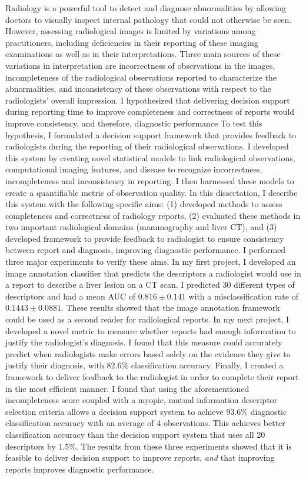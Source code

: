 Radiology is a powerful tool to detect and diagnose abnormalities by allowing doctors to visually inspect internal pathology that could not otherwise be seen. 
However, assessing radiological images is limited by variations among practitioners, including deficiencies in their reporting of these imaging examinations as well as in their interpretations. 
Three main sources of these variations in interpretation are incorrectness of observations in the images, incompleteness of the radiological observations reported to characterize the abnormalities, and inconsistency of these observations with respect to the radiologists' overall impression.
I hypothesized that delivering decision support during reporting time to improve completeness and correctness of reports would improve consistency, and therefore, diagnostic performance
To test this hypothesis, I formulated a decision support framework that provides feedback to radiologists during the reporting of their radiological observations.
I developed this system by creating novel statistical models to link radiological observations, computational imaging features, and disease to recognize incorrectness, incompleteness and inconsistency in reporting. 
I then harnessed these models to create a quantifiable metric of observation quality. 
In this dissertation, I describe this system with the following specific aims: (1) developed methods to assess completeness and correctness of radiology reports, (2) evaluated these methods in two important radiological domains (mammography and liver CT), and (3) developed framework to provide feedback to radiologist to ensure consistency between report and diagnosis, improving diagnostic performance.
I performed three major experiments to verify these aims.
In my first project, I developed an image annotation classifier that predicts the descriptors a radiologist would use in a report to describe a liver lesion on a CT scan. 
I predicted 30 different types of descriptors and had a mean AUC of $0.816\pm0.141$ with a misclassification rate of $0.1443\pm0.0881$. 
These results showed that the image annotation framework could be used as a second reader for radiological reports.
In my next project, I developed a novel metric to measure whether reports had enough information to justify the radiologist's diagnosis.
I found that this measure could accurately predict when radiologists make errors based solely on the evidence they give to justify their diagnosis, with $82.6\%$ classification accuracy.
Finally, I created a framework to deliver feedback to the radiologist in order to complete their report in the most efficient manner.
I found that using the aforementioned incompleteness score coupled with a myopic, mutual information descriptor selection criteria allows a decision support system to achieve $93.6\%$ diagnostic classification accuracy with an average of $4$ observations.
This achieves better classification accuracy than the decision support system that uses all 20 descriptors by $1.5\%$.
The results from these three experiments showed that it is feasible to deliver decision support to improve reports, \emph{and} that improving reports improves diagnostic performance.